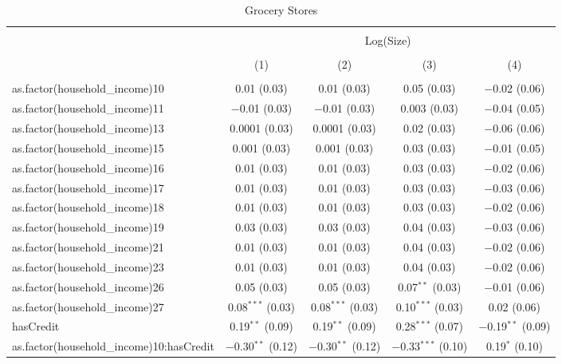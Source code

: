 
\begin{table}[!htbp] \centering 
  \caption{Grocery Stores} 
  \label{tab:packageSizeGroceryTamponLiqAppendix} 
\begin{tabular}{@{\extracolsep{5pt}}lcccc} 
\\[-1.8ex]\hline 
\hline \\[-1.8ex] 
 & \multicolumn{4}{c}{Log(Size)} \\ 
\\[-1.8ex] & (1) & (2) & (3) & (4)\\ 
\hline \\[-1.8ex] 
 as.factor(household\_income)10 & 0.01 (0.03) & 0.01 (0.03) & 0.05 (0.03) & $-$0.02 (0.06) \\ 
  as.factor(household\_income)11 & $-$0.01 (0.03) & $-$0.01 (0.03) & 0.003 (0.03) & $-$0.04 (0.05) \\ 
  as.factor(household\_income)13 & 0.0001 (0.03) & 0.0001 (0.03) & 0.02 (0.03) & $-$0.06 (0.06) \\ 
  as.factor(household\_income)15 & 0.001 (0.03) & 0.001 (0.03) & 0.03 (0.03) & $-$0.01 (0.05) \\ 
  as.factor(household\_income)16 & 0.01 (0.03) & 0.01 (0.03) & 0.03 (0.03) & $-$0.02 (0.06) \\ 
  as.factor(household\_income)17 & 0.01 (0.03) & 0.01 (0.03) & 0.03 (0.03) & $-$0.03 (0.06) \\ 
  as.factor(household\_income)18 & 0.01 (0.03) & 0.01 (0.03) & 0.03 (0.03) & $-$0.02 (0.06) \\ 
  as.factor(household\_income)19 & 0.03 (0.03) & 0.03 (0.03) & 0.04 (0.03) & $-$0.03 (0.06) \\ 
  as.factor(household\_income)21 & 0.01 (0.03) & 0.01 (0.03) & 0.04 (0.03) & $-$0.02 (0.06) \\ 
  as.factor(household\_income)23 & 0.01 (0.03) & 0.01 (0.03) & 0.04 (0.03) & $-$0.02 (0.06) \\ 
  as.factor(household\_income)26 & 0.05 (0.03) & 0.05 (0.03) & 0.07$^{**}$ (0.03) & $-$0.01 (0.06) \\ 
  as.factor(household\_income)27 & 0.08$^{***}$ (0.03) & 0.08$^{***}$ (0.03) & 0.10$^{***}$ (0.03) & 0.02 (0.06) \\ 
  hasCredit & 0.19$^{**}$ (0.09) & 0.19$^{**}$ (0.09) & 0.28$^{***}$ (0.07) & $-$0.19$^{**}$ (0.09) \\ 
  as.factor(household\_income)10:hasCredit & $-$0.30$^{**}$ (0.12) & $-$0.30$^{**}$ (0.12) & $-$0.33$^{***}$ (0.10) & 0.19$^{*}$ (0.10) \\ 

\end{tabular}
\end{table}
